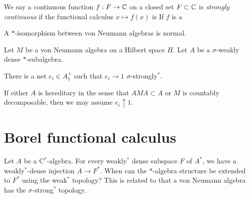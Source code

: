 \documentclass{../../large}
\begin{document}
\begin{prb}

We say a continuous function $f:F\to\mathbb{C}$ on a closed set $F\subset\mathbb{C}$ is \emph{strongly continuous} if the functional calculus $x\mapsto f(x)$ is 
If $f$ is a 


A $*$-isomorphism between von Neumann algebras is normal.

\end{prb}



\begin{prb}
Let $M$ be a von Neumann algebra on a Hilbert space $H$.
Let $A$ be a $\sigma$-weakly dense $*$-subalgebra.
\begin{parts}
\item There is a net $e_i\in A_1^+$ such that $e_i\to1$ $\sigma$-strongly$^*$.
\item If either $A$ is hereditary in the sense that $AMA\subset A$ or $M$ is countably decomposable, then we may assume $e_i\uparrow1$.
\end{parts}
\end{prb}



\section{Borel functional calculus}

Let $A$ be a C$^*$-algebra.
For every weakly$^*$ dense subspace $F$ of $A^*$, we have a weakly$^*$-dense injection $A\to F^*$.
When can the $*$-algebra structure be extended to $F^*$ using the weak$^*$ topology?
This is related to that a von Neumann algebra has the $\sigma$-strong$^*$ topology.
\end{document}
